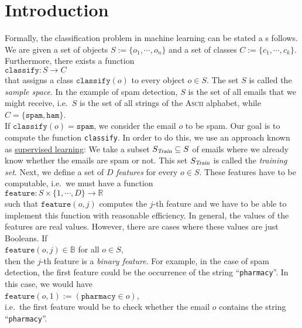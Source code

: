 \section{Introduction}
Formally, the classification problem in machine learning can be stated a s follows.  We are given a
set of objects $S := \{ o_1, \cdots, o_n \}$ and a set of classes $C := \{ c_1, \cdots, c_k \}$.  Furthermore, there exists a function 
\\[0.2cm]
\hspace*{1.3cm}
$\mathtt{classify}: S \rightarrow C$
\\[0.2cm]
that assigns a class $\texttt{classify}(o)$ to every object $o \in S$.  The set $S$ is called the \emph{sample space}.
In the example of spam detection, $S$ is the set of all emails that we might receive, i.e.~$S$ is the set of all strings
of the \textsc{Ascii} alphabet, while 
\\[0.2cm]
\hspace*{1.3cm}
$C = \{ \mathtt{spam}, \mathtt{ham} \}$.
\\[0.2cm]
If $\mathtt{classify}(o) = \mathtt{spam}$, we consider the email $o$ to be spam.  Our goal is to compute the function
\texttt{classify}.  In order to do this, we use an approach known as
\href{https://en.wikipedia.org/wiki/Supervised_learning}{supervised learning}:  We take a subset $S_\textsl{Train} \subseteq S$ of
emails where we already know whether the emails are spam or not.  This set $S_\textsl{Train}$ is called the \emph{training set}.
Next, we define a set of $D$ \emph{features} for every $o \in S$.  These features have to be computable,
i.e.~we must have a function
\\[0.2cm]
\hspace*{1.3cm}
$\mathtt{feature}: S \times \{ 1, \cdots, D \} \rightarrow \mathbb{R}$ 
\\[0.2cm]
such that $\mathtt{feature}(o, j)$ computes the $j$-th feature and we have to be able to implement
this function with reasonable efficiency.  In general, the values of the features are real values.
However, there are cases where these values are just 
Booleans.  If
\\[0.2cm]
\hspace*{1.3cm}
$\texttt{feature}(o, j) \in \mathbb{B}$ for all $o \in S$,
\\[0.2cm]
then the $j$-th feature is a \emph{binary feature}.  For example, in the case of spam detection, the first feature
could be the occurrence of the string ``\texttt{pharmacy}''.  In this case, we would have
\\[0.2cm]
\hspace*{1.3cm}
$\texttt{feature}(o, 1) := (\texttt{pharmacy} \in o)$,
\\[0.2cm]
i.e.~the first feature would be to check whether the email $o$ contains the string ``\texttt{pharmacy}''.  

